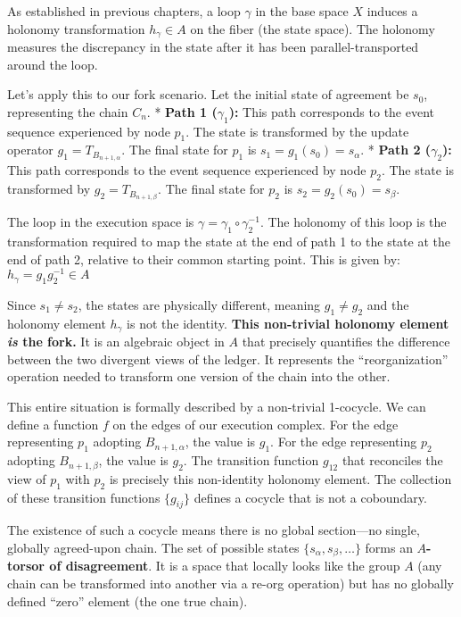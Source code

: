 \documentclass[
]{article}
\begin{document}
As established in previous chapters, a loop \(\gamma\) in the base space
\(X\) induces a holonomy transformation \(h_\gamma \in A\) on the fiber
(the state space). The holonomy measures the discrepancy in the state
after it has been parallel-transported around the loop.

Let's apply this to our fork scenario. Let the initial state of
agreement be \(s_0\), representing the chain \(C_n\). * \textbf{Path 1
(\(\gamma_1\)):} This path corresponds to the event sequence experienced
by node \(p_1\). The state is transformed by the update operator
\(g_1 = T_{B_{n+1, \alpha}}\). The final state for \(p_1\) is
\(s_1 = g_1(s_0) = s_\alpha\). * \textbf{Path 2 (\(\gamma_2\)):} This
path corresponds to the event sequence experienced by node \(p_2\). The
state is transformed by \(g_2 = T_{B_{n+1, \beta}}\). The final state
for \(p_2\) is \(s_2 = g_2(s_0) = s_\beta\).

The loop in the execution space is
\(\gamma = \gamma_1 \circ \gamma_2^{-1}\). The holonomy of this loop is
the transformation required to map the state at the end of path 1 to the
state at the end of path 2, relative to their common starting point.
This is given by: \(h_\gamma = g_1 g_2^{-1} \in A\)

Since \(s_1 \neq s_2\), the states are physically different, meaning
\(g_1 \neq g_2\) and the holonomy element \(h_\gamma\) is not the
identity. \textbf{This non-trivial holonomy element \emph{is} the fork.}
It is an algebraic object in \(A\) that precisely quantifies the
difference between the two divergent views of the ledger. It represents
the ``reorganization'' operation needed to transform one version of the
chain into the other.

This entire situation is formally described by a non-trivial 1-cocycle.
We can define a function \(f\) on the edges of our execution complex.
For the edge representing \(p_1\) adopting \(B_{n+1, \alpha}\), the
value is \(g_1\). For the edge representing \(p_2\) adopting
\(B_{n+1, \beta}\), the value is \(g_2\). The transition function
\(g_{12}\) that reconciles the view of \(p_1\) with \(p_2\) is precisely
this non-identity holonomy element. The collection of these transition
functions \(\{g_{ij}\}\) defines a cocycle that is not a coboundary.

The existence of such a cocycle means there is no global section---no
single, globally agreed-upon chain. The set of possible states
\(\{s_\alpha, s_\beta, \dots\}\) forms an \textbf{\(A\)-torsor of
disagreement}. It is a space that locally looks like the group \(A\)
(any chain can be transformed into another via a re-org operation) but
has no globally defined ``zero'' element (the one true chain).
\end{document}
